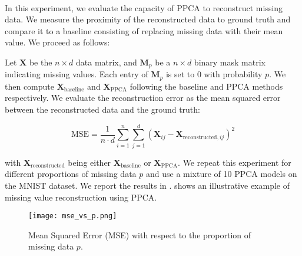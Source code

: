 \documentclass{article}
\begin{document}
\paragraph{} In this experiment, we evaluate the capacity of PPCA to reconstruct missing data. We measure the proximity of the reconstructed data to ground truth and compare it to %
a baseline consisting of replacing missing data with their mean value. We proceed as follows:




Let $\mathbf{X}$ be the $n \times d$ data matrix, and $\mathbf{M}_p$ be a $n \times d$ binary mask matrix indicating missing values. Each entry of $\mathbf{M}_p$ is set to $0$ with probability $p$. We then compute $\mathbf{X}_{\text{baseline}}$ and $\mathbf{X}_{\text{PPCA}}$ following the baseline and PPCA methods respectively. We evaluate the reconstruction error as the mean squared error between the reconstructed data and the ground truth:

\begin{equation}
    \label{eq:missing_data_error}
    \text{MSE} = \frac{1}{n \cdot d} \sum_{i=1}^n \sum_{j=1}^d \left(\mathbf{X}_{ij} - \mathbf{X}_{\text{reconstructed},ij}\right)^2
\end{equation}

with $\mathbf{X}_{\text{reconstructed}}$ being either $\mathbf{X}_{\text{baseline}}$ or $\mathbf{X}_{\text{PPCA}}$. We repeat this experiment for different proportions of missing data $p$ and use a mixture of 10 PPCA models on the MNIST dataset. We report the results in .  shows an illustrative example of missing value reconstruction using PPCA.

\begin{figure}[h]
    \centering
    \texttt{[image: mse\_vs\_p.png]}
    \caption{Mean Squared Error (MSE) with respect to the proportion of missing data $p$.}
    \label{fig:mse_vs_p}
\end{figure}
\end{document}
